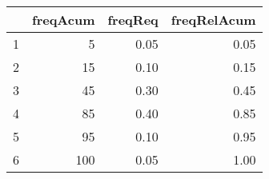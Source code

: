 \begin{table}[ht]
\centering
\begin{tabular}{rrrr}
  \hline
 & freqAcum & freqReq & freqRelAcum \\ 
  \hline
1 &   5 & 0.05 & 0.05 \\ 
  2 &  15 & 0.10 & 0.15 \\ 
  3 &  45 & 0.30 & 0.45 \\ 
  4 &  85 & 0.40 & 0.85 \\ 
  5 &  95 & 0.10 & 0.95 \\ 
  6 & 100 & 0.05 & 1.00 \\ 
   \hline
\end{tabular}
\end{table}
